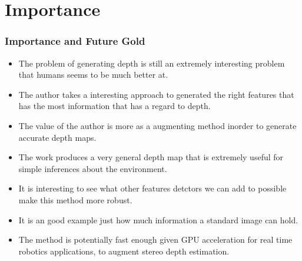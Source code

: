 \documentclass[handout]{beamer}
\newcommand{\vitem}{\vfill\item}
\begin{document}
\section{Importance}
\begin{frame}[t]\frametitle{Importance and Future Gold}
    \begin{itemize}
        \item The problem of generating depth is still an extremely interesting problem that humans seems to be much better at.
        \vitem The author takes a interesting approach to generated the right features that has the most information that has a regard to depth. 
        \vitem The value of the author is more as a augmenting method inorder to generate accurate depth maps.
        \vitem The work produces a very general depth map that is extremely useful for simple inferences about the environment.
        \vitem It is interesting to see what other features detctors we can add to possible make this method more robust.
        \vitem It is an good example just how much information a standard image can hold.
        \vitem The method is potentially fast enough given GPU acceleration for real time robotics applications, to augment stereo depth estimation.
    \end{itemize}
\end{frame}
\end{document}
